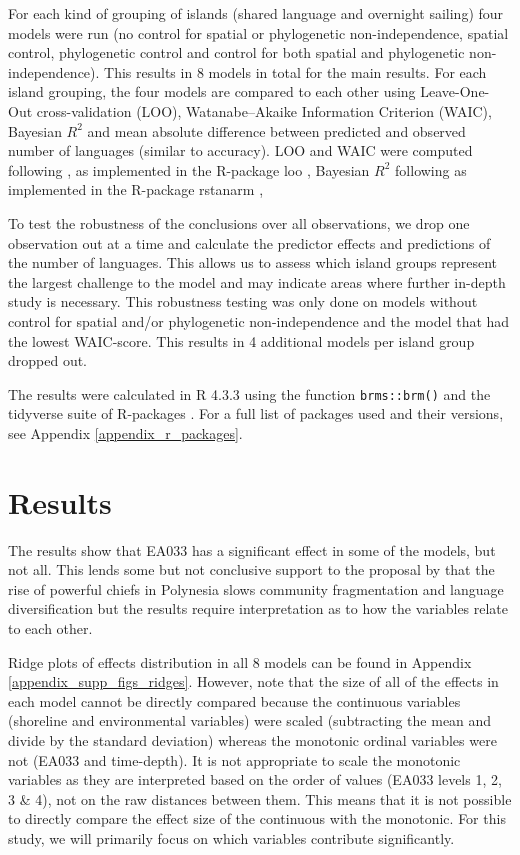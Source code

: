 \documentclass[unnumsec,webpdf,modern,medium]{oup-authoring-template}
\begin{document}
For each kind of grouping of islands (shared language and overnight sailing) four models were run (no control for spatial or phylogenetic non-independence, spatial control, phylogenetic control and control for both spatial and phylogenetic non-independence). This results in 8 models in total for the main results. For each island grouping, the four models are compared to each other using Leave-One-Out cross-validation (LOO), Watanabe–Akaike Information Criterion (WAIC), Bayesian $R^2$ and mean absolute difference between predicted and observed number of languages (similar to accuracy). LOO and WAIC were computed following  \citet{vehtari2017practical}, as implemented in the R-package loo \citep{R-loo}, Bayesian $R^2$ following \citet{gelman2019r} as implemented in the R-package rstanarm \citep{R-rstanarm},

To test the robustness of the conclusions over all observations, we drop one observation out at a time and calculate the predictor effects and predictions of the number of languages. This allows us to assess which island groups represent the largest challenge to the model and may indicate areas where further in-depth study is necessary. This robustness testing was only done on models without control for spatial and/or phylogenetic non-independence and the model that had the lowest WAIC-score. This results in 4 additional models per island group dropped out.

The results were calculated in R 4.3.3 \citep{R} using the function \texttt{brms::brm()} \citep{burkner2017brms} and the tidyverse suite of R-packages \citep{tidyverse13}. For a full list of packages used and their versions, see Appendix \ref{appendix_r_packages}.

\FloatBarrier
\section{Results}
The results show that EA033 has a significant effect in some of the models, but not all. This lends some but not conclusive support to the proposal by \citet{pawley81, pawley2007} that the rise of powerful chiefs in Polynesia slows community fragmentation and language diversification but the results require interpretation as to how the variables relate to each other.

Ridge plots of effects distribution in all 8 models can be found in Appendix \ref{appendix_supp_figs_ridges}. However, note that the size of all of the effects in each model cannot be directly compared because the continuous variables (shoreline and environmental variables) were scaled (subtracting the mean and divide by the standard deviation) whereas the monotonic ordinal variables were not (EA033 and time-depth). It is not appropriate to scale the monotonic variables as they are interpreted based on the order of values (EA033 levels 1, 2, 3 \& 4), not on the raw distances between them. This means that it is not possible to directly compare the effect size of the continuous with the monotonic. For this study, we will primarily focus on which variables contribute significantly. 
\end{document}
